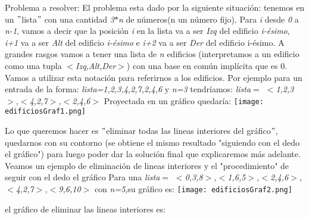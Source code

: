 \documentclass{article}
\begin{document}
{\noindent \Huge Problema a resolver:}
\newline \newline  El problema esta dado por la siguiente situaci\'on: 
tenemos en un $"$lista$"$ con una cantidad \textit{3$*$n} de n\'umeros(n un n\'umero fijo).\newline
Para \textit{i} desde \textit{0} a \textit{n-1}, vamos a decir que la posici\'on \textit{i} en la lista va a ser \textit{Izq} del edificio \textit{i-\'esimo}, \textit{i+1} va a ser \textit{Alt} del edificio \textit{i-\'esimo} e \textit{i+2} va a ser \textit{Der} del edificio i-\'esimo.\newline
A grandes rasgos vamos a tener una lista de \textit{n} edificios (interpretamos a un edificio como una tupla \textit{$<$Izq,Alt,Der$>$}) con una base en com\'un impl\'icita que es 0.\newline
Vamos a utilizar esta notación para referirnos a los edificios.\newline
Por ejemplo para un entrada de la forma: \newline
\textit{lista={1,2,3,4,2,7,2,4,6}} y 
\textit{n=3} tendr\'iamos: \newline 
\textit{lista$=$ $<$1,2,3$>$,$<$4,2,7$>$,$<$2,4,6$>$}\newline 
Proyectada en un gr\'afico quedar\'ia: \newline
\vspace{0.4cm}
\texttt{[image: edificiosGraf1.png]}
\begin {flushleft}
\end{flushleft}
Lo que queremos hacer es $"$eliminar todas las lineas interiores del gr\'afico$"$, quedarnos con su contorno (se obtiene el mismo resultado  "siguiendo con el dedo el gr\'afico") para luego poder dar la solución final que explicaremos más adelante. \newpage
Veamos un ejemplo de eliminación de lineas interiores y el "procedimiento" de seguir con el dedo el gráfico \newline
Para una \textit{lista$=$ $<$0,3,8$>$,$<$1,6,5$>$,$<$2,4,6$>$,$<$4,2,7$>$,$<$9,6,10$>$} con \textit{n=5},\newline su gr\'afico es: \newline
\texttt{[image: edificiosGraf2.png]}
\begin {flushleft}
\end{flushleft}
el gr\'afico de eliminar las lineas interiores es:\newline
\end{document}
